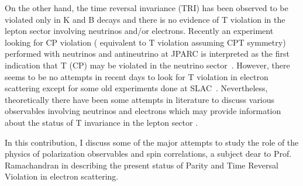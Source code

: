    On the other hand, the time reversal invariance (TRI) has been observed to be violated only in K and B decays and there is no evidence of T  violation in the  lepton sector  involving neutrinos and/or  electrons.  Recently an experiment looking for CP  violation ( equivalent to T    violation assuming CPT symmetry) performed with neutrinos and antineutrino at JPARC  is  interpreted as the first indication that T (CP) may be violated in the neutrino sector~\cite{nature}. However,  there seems to be no attempts in recent days to look for T  violation  in electron scattering except for some old experiments done at SLAC~\cite{Prepost:1968bow,Rock:1970sj}. Nevertheless, theoretically there have been some attempts in literature to discuss various  observables involving neutrinos and electrons which may provide information about the status of T  invariance in the lepton  sector  \cite{Ramachandran:1967vci,Frederico:1991vb,Fatima:2018gjy,Fatima:2018tzs}. 
   
   
     In this contribution,  I discuss some of the major  attempts to study the role of the physics of polarization observables and spin correlations, a subject dear to Prof. Ramachandran in describing the present status of Parity and Time Reversal Violation in electron scattering.
